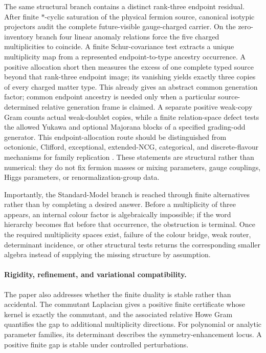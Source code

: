 \documentclass[11pt]{article}
\numberwithin{equation}{section}
\theoremstyle{definition}
\theoremstyle{remark}
\begin{document}
The same structural branch contains a distinct rank-three endpoint residual.
After finite $*$-cyclic saturation of the physical fermion source, canonical
isotypic projectors audit the complete future-visible gauge-charged carrier.
On the zero-inventory branch four linear anomaly relations force the five
charged multiplicities to coincide.  A finite Schur-covariance test extracts a
unique multiplicity map from a represented endpoint-to-type ancestry
occurrence.  A positive allocation short then measures the excess of one
complete typed source beyond that rank-three endpoint image; its vanishing
yields exactly three copies of every charged matter type.  This already
gives an abstract common generation factor; common endpoint ancestry is needed
only when a particular source-determined relative generation frame is claimed.
A separate positive weak-copy Gram counts actual weak-doublet copies, while a
finite relation-space defect tests the allowed Yukawa and optional Majorana
blocks of a specified grading-odd generator.  This endpoint-allocation route
should be distinguished from octonionic, Clifford, exceptional, extended-NCG,
categorical, and discrete-flavour mechanisms for family replication
\cite{Furey2018,Gresnigt2026,Baez2026,YuMa2018,Patrascu2026,AltarelliFeruglio2010}.
These statements are structural
rather than numerical: they do not fix fermion masses or mixing parameters,
gauge couplings, Higgs parameters, or renormalization-group data.

Importantly, the Standard-Model branch is reached through finite alternatives
rather than by completing a desired answer.  Before a multiplicity of three
appears, an internal colour factor is algebraically impossible; if the word
hierarchy becomes flat before that occurrence, the obstruction is terminal.
Once the required multiplicity spaces exist, failure of the colour bridge,
weak router, determinant incidence, or other structural tests returns the
corresponding smaller algebra instead of supplying the missing structure by
assumption.


\paragraph{Rigidity, refinement, and variational compatibility.}

The paper also addresses whether the finite duality is stable rather than
accidental.  The commutant Laplacian gives a positive finite certificate whose
kernel is exactly the commutant, and the associated relative Howe Gram
quantifies the gap to additional multiplicity directions.  For polynomial or
analytic parameter families, its determinant describes the
symmetry-enhancement locus.  A positive finite gap is stable under controlled
perturbations.
\end{document}

